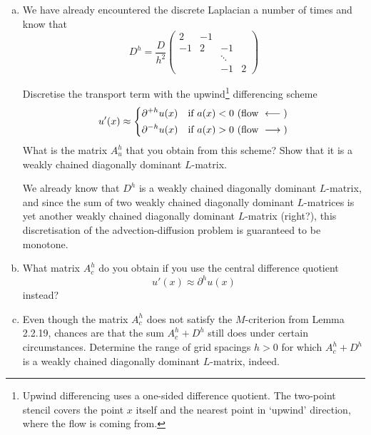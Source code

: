 \documentclass[10pt,letterpaper]{scrartcl}
\begin{document}
\begin{enumerate}[(a)]
\item We have already encountered the discrete Laplacian a number of times and know that
\begin{equation*}
D^h = \frac{D}{h^2} \left(
\begin{array}{cccc}
2 & -1\\
-1 & 2 & -1\\
& & \ddots\\
& & -1 & 2
\end{array}
\right)
\end{equation*}

Discretise the transport term with the upwind\footnote{Upwind differencing uses a one-sided difference quotient. The two-point stencil covers the point $x$ itself and the nearest point in `upwind' direction, where the flow is coming from.} differencing scheme
\begin{equation*}
u'(x) \approx
\begin{dcases}
\partial^{+h}u(x) & \text{if } a(x)<0 \text{ (flow } \longleftarrow \text{)}\\
\partial^{-h}u(x) & \text{if } a(x)>0 \text{ (flow } \longrightarrow \text{)}
\end{dcases}
\end{equation*}
What is the matrix $A^h_u$ that you obtain from this scheme? Show that it is a weakly chained diagonally dominant $L$-matrix.

\newpage

\mbox{}
\vfill

We already know that $D^h$ is a weakly chained diagonally dominant $L$-matrix, and since the sum of two weakly chained diagonally dominant $L$-matrices is yet another weakly chained diagonally dominant $L$-matrix (right?), this discretisation of the advection-diffusion problem is guaranteed to be monotone.

\newpage

\item What matrix $A^h_c$ do you obtain if you use the central difference quotient
\begin{equation*}
u'(x) \approx \partial^h u(x)
\end{equation*}
instead?
          
\vfill

\item Even though the matrix $A^h_c$ does not satisfy the $M$-criterion from Lemma 2.2.19, chances are that the sum $A^h_c + D^h$ still does under certain circumstances. Determine the range of grid spacings $h>0$ for which $A^h_c + D^h$ is a weakly chained diagonally dominant $L$-matrix, indeed.


\end{enumerate}
\end{document}
